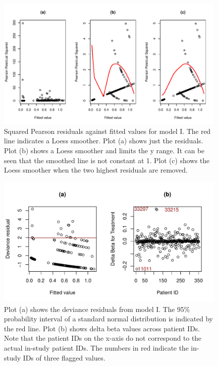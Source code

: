\documentclass[paper=a4, fontsize=11pt]{scrartcl} %
\numberwithin{equation}{section} %
\numberwithin{figure}{section} %
\numberwithin{table}{section} %
\begin{document}
\captionsetup{width=.9\textwidth}
\begin{figure}[H]
\centering
\includegraphics[width=.9\textwidth]{./rcode/plots/model_i_pearson}
\caption{Squared Pearson residuals against fitted values for model I. The red line indicates a Loess smoother. Plot (a) shows just the residuals. Plot (b) shows a Loess smoother and limits the y range. It can be seen that the smoothed line is not constant at 1. Plot (c) shows the Loess smoother when the two highest residuals are removed.}
\label{fig:model_i_pearson}
\end{figure}
\begin{figure}[H]
\centering
\includegraphics[width=.9\textwidth]{./rcode/plots/model_i_diagnostics}
\caption{Plot (a) shows the deviance residuals from model I. The 95\% probability interval of a standard normal distribution is indicated by the red line. Plot (b) shows delta beta values across patient IDs. Note that the patient IDs on the x-axis do not correspond to the actual in-study patient IDs. The numbers in red indicate the in-study IDs of three flagged values.}
\label{fig:model_i_diagnostics}
\end{figure}
\end{document}
